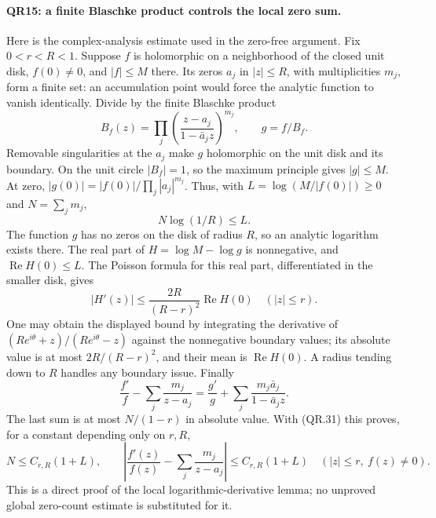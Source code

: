 \paragraph{QR15: a finite Blaschke product controls the local zero sum.}
Here is the complex-analysis estimate used in the zero-free argument.
Fix $0<r<R<1$. Suppose $f$ is holomorphic on a neighborhood of the
closed unit disk, $f(0)\ne0$, and $|f|\le M$ there. Its zeros
$a_j$ in $|z|\le R$, with multiplicities $m_j$, form a finite set:
an accumulation point would force the analytic function to vanish
identically. Divide by the finite Blaschke product
\[
 B_f(z)=\prod_j\left(\frac{z-a_j}{1-\bar a_jz}\right)^{m_j},
                    \qquad g=f/B_f.
\]
Removable singularities at the $a_j$ make $g$ holomorphic on the
unit disk and its boundary. On the unit circle $|B_f|=1$, so the
maximum principle gives $|g|\le M$. At zero,
$|g(0)|=|f(0)|/\prod_j|a_j|^{m_j}$. Thus, with
$L=\log(M/|f(0)|)\ge0$ and $N=\sum_jm_j$,
\[
                     N\log(1/R)\le L.                    \tag{QR.31}
\]
The function $g$ has no zeros on the disk of radius $R$, so an
analytic logarithm exists there. The real part of
$H=\log M-\log g$ is nonnegative, and
$\operatorname{Re}H(0)\le L$. The Poisson formula for this real
part, differentiated in the smaller disk, gives
\[
       |H'(z)|\le\frac{2R}{(R-r)^2}\operatorname{Re}H(0)
                                        \quad(|z|\le r).
\]
One may obtain the displayed bound by integrating the derivative of
$(Re^{i\theta}+z)/(Re^{i\theta}-z)$ against the nonnegative boundary
values; its absolute value is at most $2R/(R-r)^2$, and their mean
is $\operatorname{Re}H(0)$. A radius tending down to $R$ handles
any boundary issue. Finally
\[
 \frac{f'}f-\sum_j\frac{m_j}{z-a_j}
       =\frac{g'}g+\sum_j\frac{m_j\bar a_j}{1-\bar a_jz}.
\]
The last sum is at most $N/(1-r)$ in absolute value. With (QR.31)
this proves, for a constant depending only on $r,R$,
\[
 N\le C_{r,R}(1+L),\qquad
 \left|\frac{f'(z)}{f(z)}-\sum_j\frac{m_j}{z-a_j}\right|
       \le C_{r,R}(1+L)\quad(|z|\le r,\ f(z)\ne0).        \tag{QR.32}
\]
This is a direct proof of the local logarithmic-derivative lemma;
no unproved global zero-count estimate is substituted for it.

